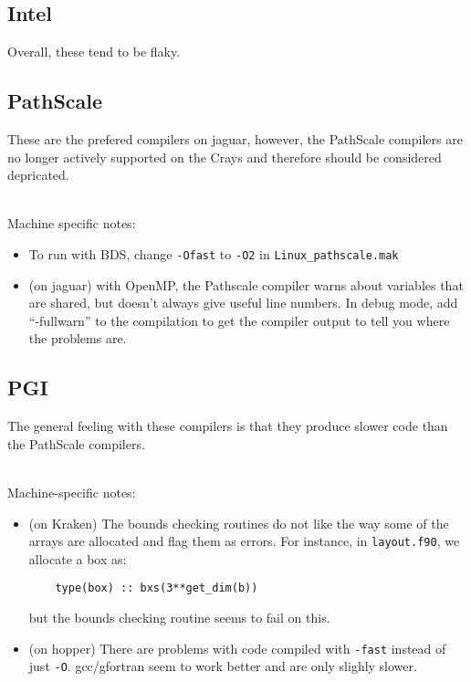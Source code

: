 \subsection{Intel}

Overall, these tend to be flaky. 


\subsection{PathScale}

These are the prefered compilers on jaguar, however, the PathScale
compilers are no longer actively supported on the Crays and therefore
should be considered depricated. 


\ \\
Machine specific notes:
\begin{itemize}

\item  To run with BDS, change {\tt -Ofast} to {\tt -O2} in {\tt Linux\_pathscale.mak}

\item (on jaguar) with OpenMP, the Pathscale compiler warns about
  variables that are shared, but doesn't always give useful line
  numbers.  In debug mode, add ``-fullwarn'' to the compilation to get
  the compiler output to tell you where the problems are. 


\end{itemize}


\subsection{PGI}

The general feeling with these compilers is that they produce slower
code than the PathScale compilers.

\ \\
Machine-specific notes:
\begin{itemize}

\item (on Kraken) The bounds checking routines do not like the way some of
the arrays are allocated and flag them as errors.  For instance, in
{\tt layout.f90}, we allocate a box as:
\begin{verbatim}
    type(box) :: bxs(3**get_dim(b))
\end{verbatim}
but the bounds checking routine seems to fail on this.

\item (on hopper) There are problems with code compiled with {\tt -fast}
instead of just {\tt -O}.  gcc/gfortran seem to work better and 
are only slighly slower.
\end{itemize}



